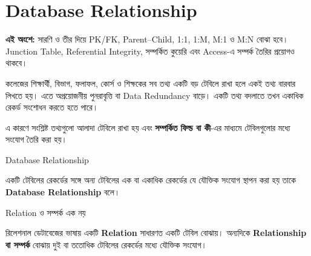 %

\section{Database Relationship}
\label{sec:ch06-relationships}



\textbf{এই অংশে:} সারণি ও তীর দিয়ে PK/FK, Parent--Child, 1:1, 1:M, M:1 ও M:N বোঝা হবে। Junction Table, Referential Integrity, সম্পর্কিত কুয়েরি এবং Access-এ সম্পর্ক তৈরির প্রয়োগও থাকবে।



কলেজের শিক্ষার্থী, বিভাগ, ফলাফল, কোর্স ও শিক্ষকের সব তথ্য একটি বড় টেবিলে রাখা হলে একই তথ্য বারবার লিখতে হয়। এতে অপ্রয়োজনীয় পুনরাবৃত্তি বা Data Redundancy বাড়ে। একটি তথ্য বদলাতে তখন একাধিক রেকর্ড সংশোধন করতে হতে পারে।

এ কারণে সংশ্লিষ্ট তথ্যগুলো আলাদা টেবিলে রাখা হয় এবং
\textbf{সম্পর্কিত ফিল্ড বা কী}-এর মাধ্যমে টেবিলগুলোর মধ্যে
সংযোগ তৈরি করা হয়।

\begin{definitionbox}{Database Relationship}

একটি টেবিলের রেকর্ডের সঙ্গে অন্য টেবিলের এক বা একাধিক
রেকর্ডের যে যৌক্তিক সংযোগ স্থাপন করা হয় তাকে
\textbf{Database Relationship} বলে।

\end{definitionbox}


\begin{keypointbox}{Relation ও সম্পর্ক এক নয়}

রিলেশনাল ডেটাবেজের ভাষায় একটি \textbf{Relation} সাধারণত
একটি টেবিল বোঝায়। অন্যদিকে \textbf{Relationship বা সম্পর্ক} বোঝায় দুই বা ততোধিক টেবিলের
রেকর্ডের মধ্যে যৌক্তিক সংযোগ।

\end{keypointbox}



